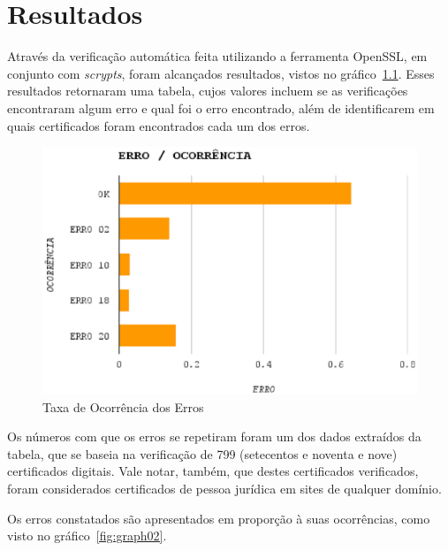

\chapter[Resultados]{Resultados}

	Através da verificação automática feita utilizando a ferramenta OpenSSL, em conjunto com \textit{scrypts}, foram alcançados resultados, vistos no gráfico~\ref{fig:graph01}. Esses resultados retornaram uma tabela, cujos valores incluem se as verificações encontraram algum erro e qual foi o erro encontrado, além de identificarem em quais certificados foram encontrados cada um dos erros.

	\begin{figure}[h]
		\centering
		\includegraphics[keepaspectratio=true,scale=1]{figuras/graph01.eps}
		\caption{Taxa de Ocorrência dos Erros}
		\label{fig:graph01}
	\end{figure}

	Os números com que os erros se repetiram foram um dos dados extraídos da tabela, que se baseia na verificação de 799 (setecentos e noventa e nove) certificados digitais. Vale notar, também, que destes certificados verificados, foram considerados certificados de pessoa jurídica em sites de qualquer domínio.

	Os erros constatados são apresentados em proporção à suas ocorrências, como visto no gráfico~\ref{fig:graph02}.

